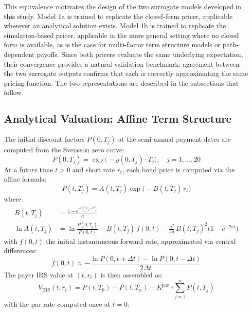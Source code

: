   \noindent
  This equivalence motivates the design of the two surrogate models developed in this study. Model 1a is trained to replicate the closed-form pricer, applicable wherever an analytical solution exists. Model 1b is trained to replicate the simulation-based pricer, applicable in the more general setting where no closed form is available, as is the case for multi-factor term structure models or path-dependent payoffs. Since both pricers evaluate the same underlying expectation, their convergence provides a natural validation benchmark: agreement between the two surrogate outputs confirms that each is correctly approximating the same pricing function. The two representations are described in the subsections that follow. \\

  \subsection*{Analytical Valuation: Affine Term Structure}
  \label{sec:affine_pricing}

  The initial discount factors $P(0,T_j)$ at the semi-annual payment dates are computed from the Svensson zero curve:
  \begin{equation}
    P(0, T_j) = \exp\bigl(-y(0, T_j) \cdot T_j\bigr), \quad j = 1,\ldots,20
    \label{eq:df_svensson}
  \end{equation}
  At a future time $t > 0$ and short rate $r_t$, each bond price is computed via the affine formula:
  \begin{equation}
    P(t, T_j) = A(t, T_j)\exp\bigl(-B(t, T_j)\,r_t\bigr)
    \label{eq:hw_bond}
  \end{equation}
  where:
  \begin{align}
    B(t, T_j) &= \frac{1 - e^{-a(T_j - t)}}{a}
    \label{eq:hw_B} \\[4pt]
    \ln A(t, T_j) &= \ln\frac{P(0,T_j)}{P(0,t)}
      - B(t,T_j)\,f(0,t)
      - \frac{\sigma^2}{4a}\,B(t,T_j)^2\bigl(1 - e^{-2at}\bigr)
    \label{eq:hw_A}
  \end{align}
  with $f(0,t)$ the initial instantaneous forward rate, approximated via central differences:
  \begin{equation}
    f(0,t) \approx -\frac{\ln P(0, t+\Delta t) - \ln P(0, t-\Delta t)}{2\Delta t}
    \label{eq:fwd_finite_diff}
  \end{equation}
  The payer IRS value at $(t, r_t)$ is then assembled as:
  \begin{equation}
    V_{\mathrm{IRS}}(t, r_t)
      = P(t, T_0) - P(t, T_n)
        - K^{\mathrm{par}}\,\tau \sum_{j=1}^{n} P(t, T_j)
    \label{eq:irs_value}
  \end{equation}
  with the par rate computed once at $t = 0$:
 
